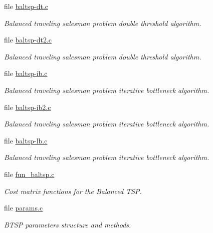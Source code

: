 \begin{CompactItemize}
\item 
file \hyperlink{lib_2baltsp_2baltsp-dt_8c}{baltsp-dt.c}
\begin{CompactList}\small\item\em Balanced traveling salesman problem double threshold algorithm. \item\end{CompactList}

\item 
file \hyperlink{lib_2baltsp_2baltsp-dt2_8c}{baltsp-dt2.c}
\begin{CompactList}\small\item\em Balanced traveling salesman problem double threshold algorithm. \item\end{CompactList}

\item 
file \hyperlink{lib_2baltsp_2baltsp-ib_8c}{baltsp-ib.c}
\begin{CompactList}\small\item\em Balanced traveling salesman problem iterative bottleneck algorithm. \item\end{CompactList}

\item 
file \hyperlink{lib_2baltsp_2baltsp-ib2_8c}{baltsp-ib2.c}
\begin{CompactList}\small\item\em Balanced traveling salesman problem iterative bottleneck algorithm. \item\end{CompactList}

\item 
file \hyperlink{lib_2baltsp_2baltsp-lb_8c}{baltsp-lb.c}
\begin{CompactList}\small\item\em Balanced traveling salesman problem iterative bottleneck algorithm. \item\end{CompactList}

\item 
file \hyperlink{fun__baltsp_8c}{fun\_\-baltsp.c}
\begin{CompactList}\small\item\em Cost matrix functions for the Balanced TSP. \item\end{CompactList}

\item 
file \hyperlink{baltsp_2params_8c}{params.c}
\begin{CompactList}\small\item\em BTSP parameters structure and methods. \item\end{CompactList}


\end{CompactItemize}
